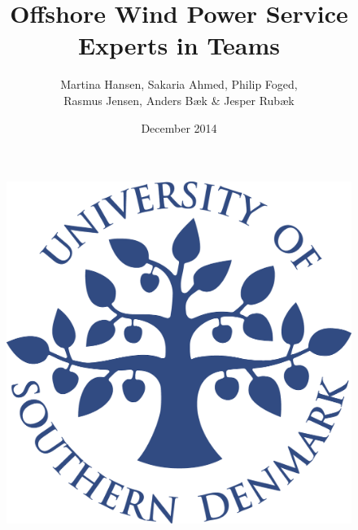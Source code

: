 \title{Offshore Wind Power Service  \\ Experts in Teams}
\author{Martina Hansen, Sakaria Ahmed, Philip Foged, \\Rasmus Jensen, Anders Bæk \& Jesper Rubæk}
\date{December 2014}
\begin{figure}
\centering
\includegraphics[width=1\textwidth]{graphics/forside.png}
\end{figure}
\maketitle

